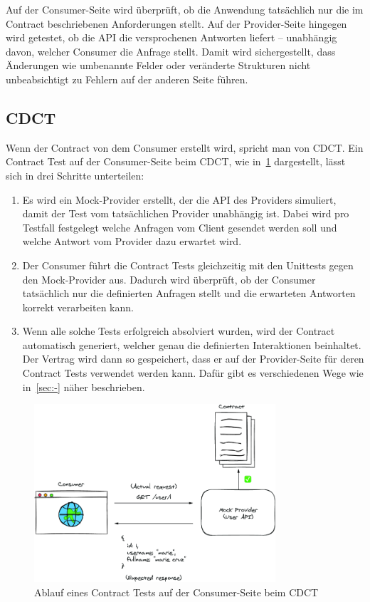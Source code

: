 Auf der Consumer-Seite wird überprüft, ob die Anwendung tatsächlich nur die im Contract beschriebenen Anforderungen stellt.
Auf der Provider-Seite hingegen wird getestet, ob die \gls{API} die versprochenen Antworten liefert – unabhängig davon, welcher Consumer die Anfrage stellt.
Damit wird sichergestellt, dass Änderungen wie \zB{}umbenannte Felder oder veränderte Strukturen nicht unbeabsichtigt zu Fehlern auf der anderen Seite führen.

\subsection{\glsdesc{CDCT}}\label{subsec:foundation_contracttesting_variants}

Wenn der Contract von dem Consumer erstellt wird, spricht man von \gls{CDCT}.
Ein Contract Test auf der Consumer-Seite beim \gls{CDCT}, wie in~\cref{fig:cdct-consumer-side} dargestellt, lässt sich in drei Schritte unterteilen:
\begin{enumerate}
    \item Es wird ein \gls{Mock}-Provider erstellt, der die \gls{API} des Providers simuliert, damit der Test vom tatsächlichen Provider unabhängig ist.
    Dabei wird pro Testfall festgelegt welche Anfragen vom Client gesendet werden soll und welche Antwort vom Provider dazu erwartet wird.
    \item Der Consumer führt die Contract Tests gleichzeitig mit den Unittests gegen den \gls{Mock}-Provider aus.
    Dadurch wird überprüft, ob der Consumer tatsächlich nur die definierten Anfragen stellt und die erwarteten Antworten korrekt verarbeiten kann.
    \item Wenn alle solche Tests erfolgreich absolviert wurden, wird der Contract automatisch generiert, welcher genau die definierten Interaktionen beinhaltet.
    Der Vertrag wird dann so gespeichert, dass er auf der Provider-Seite für deren Contract Tests verwendet werden kann.
    Dafür gibt es verschiedenen Wege wie in~\cref{sec:-} näher beschrieben.
\end{enumerate}

\begin{figure}[ht]
    \centering
    \includegraphics[width=0.8\textwidth]{figures/consumer-side}
    \caption{Ablauf eines Contract Tests auf der Consumer-Seite beim \gls{CDCT}}
    \label{fig:cdct-consumer-side}
\end{figure}

